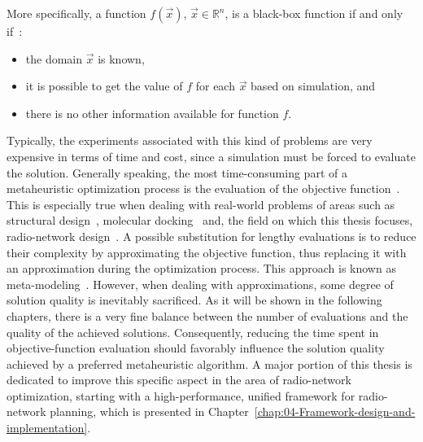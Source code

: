 More specifically, a function $f(\vec{x})$, $\vec{x}\in\mathbb{R}^{n}$,
is a black-box function if and only if~\cite{Talbi_Metaheuristics:2009}:
\begin{itemize}
\item the domain $\vec{x}$ is known,
\item it is possible to get the value of $f$ for each $\vec{x}$ based
on simulation, and
\item there is no other information available for function $f$.
\end{itemize}
Typically, the experiments associated with this kind of problems are
very expensive in terms of time and cost, since a simulation must
be forced to evaluate the solution. Generally speaking, the most time-consuming
part of a metaheuristic optimization process is the evaluation of
the objective function~\cite{Talbi_Metaheuristics:2009}. This is
especially true when dealing with real-world problems of areas such
as structural design~\cite{Barthelemy-Approximation_concepts_for_optimum_structural_design:1993},
molecular docking~\cite{Tantar-A_parallel_hybrid_genetic_algorithm_for_protein_structure_prediction:2007}
and, the field on which this thesis focuses, radio-network design~\cite{Benedicic_Pilot.power.optimization:2010,Benedicic_Balancing_downlink_uplink_soft_handover_areas_in_UMTS_networks:2012,Benedicic-A_GPU_based_parallel_agent_optimization_approach:2013,Benedicic-A_GRASS_GIS_parallel_module_for_radio-propagation_predictions:2013}.
A possible substitution for lengthy evaluations is to reduce their
complexity by approximating the objective function, thus replacing
it with an approximation during the optimization process. This approach
is known as meta-modeling~\cite{Talbi_Metaheuristics:2009}. However,
when dealing with approximations, some degree of solution quality
is inevitably sacrificed. As it will be shown in the following chapters,
there is a very fine balance between the number of evaluations and
the quality of the achieved solutions. Consequently, reducing the
time spent in objective-function evaluation should favorably influence
the solution quality achieved by a preferred metaheuristic algorithm.
A major portion of this thesis is dedicated to improve this specific
aspect in the area of radio-network optimization, starting with a
high-performance, unified framework for radio-network planning, which
is presented in Chapter~\ref{chap:04-Framework-design-and-implementation}.

\bigskip{}


